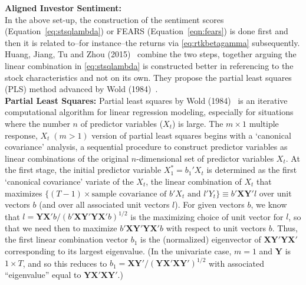 \noindent\textbf{Aligned Investor Sentiment:} \\


In the above set-up, the construction of the sentiment scores (Equation~\ref{eq:stsqlambda}) or FEARS (Equation~\ref{eqn:fears}) is done first and then it is related to--for instance--the returns via \eqref{eq:rtkbetagamma} subsequently. Huang, Jiang, Tu and Zhou (2015)~\cite{huang} combine the two steps, together arguing the linear combination in \eqref{eq:stsqlambda} is constructed better in referencing to the stock characteristics and not on its own. They propose the partial least squares (PLS) method advanced by Wold (1984)~\cite{wold}. \\


\noindent\textbf{Partial Least Squares:} Partial least squares by Wold (1984)~\cite{wold} is an iterative computational algorithm for linear regression modeling, especially for situations where the number $n$ of predictor variables ($X_t$) is large. The $m \times 1$ multiple response, $X_t \;(m>1)$ version of partial least squares begins with a `canonical covariance' analysis, a sequential procedure to construct predictor variables as linear combinations of the original $n$-dimensional set of predictor variables $X_t$. At the first stage, the initial predictor variable $X_{1}^*=b_1'X_t$ is determined as the first `canonical covariance' variate of the $X_t$, the linear combination of $X_t$ that maximizes $\{(T - 1) \times \text{sample covariance of } b'X_t \text{ and } l'Y_t \} \equiv b' \mathbf{XY}' l$ over unit vectors $b$ (and over all associated unit vectors $l$). For given vectors $b$, we know that $l=\mathbf{YX'} b/(b' \mathbf{XY'YX'}b)^{1/2}$ is the maximizing choice of unit vector for $l$, so that we need then to maximize $b' \mathbf{XY'YX'}b$ with respect to unit vectors $b$. Thus, the first linear combination vector $b_1$ is the (normalized) eigenvector of $\mathbf{XY'YX'}$ corresponding to its largest eigenvalue. (In the univariate case, $m=1$ and $\mathbf{Y}$ is $1 \times T$, and so this reduces to $b_1=\mathbf{XY'}/(\mathbf{YX'XY'})^{1/2}$ with associated ``eigenvalue'' equal to $\mathbf{YX'XY'}$.)


